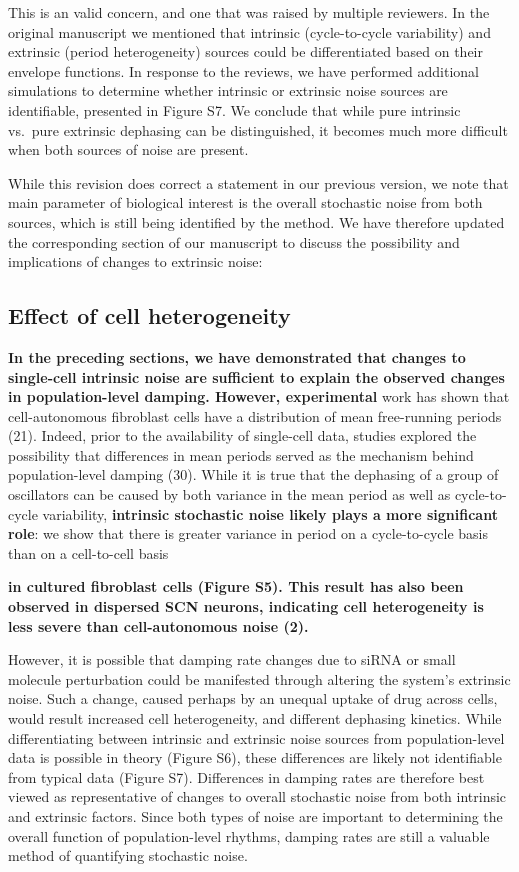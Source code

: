 \documentclass[11pt, letterpaper]{article}
\newenvironment{manuscript}[1]{\begin{center}\begin{tcolorbox}[colback=green!5!white,colframe=green!75!black,width=\textwidth,title={#1},breakable,fonttitle=\bfseries]}{\end{tcolorbox}\end{center}}
\begin{document}
This is an valid concern, and one that was raised by multiple reviewers.
In the original manuscript we mentioned that intrinsic (cycle-to-cycle variability) and extrinsic (period heterogeneity) sources could be differentiated based on their envelope functions.
In response to the reviews, we have performed additional simulations to determine whether intrinsic or extrinsic noise sources are identifiable, presented in Figure S7.
We conclude that while pure intrinsic vs.\ pure extrinsic dephasing can be distinguished, it becomes much more difficult when both sources of noise are present.

While this revision does correct a statement in our previous version, we note that main parameter of biological interest is the overall stochastic noise from both sources, which is still being identified by the method.
We have therefore updated the corresponding section of our manuscript to discuss the possibility and implications of changes to extrinsic noise:

\begin{manuscript}{Page 8}
  \section*{Effect of cell heterogeneity}
  {\bfseries
In the preceding sections, we have demonstrated that changes to single-cell intrinsic noise are sufficient to explain the observed changes in population-level damping. 
However, experimental} work has shown that cell-autonomous fibroblast cells have a distribution of mean free-running periods (21). 
Indeed, prior to the availability of single-cell data, studies explored the possibility that differences in mean periods served as the mechanism behind population-level damping (30). 
While it is true that the dephasing of a group of oscillators can be caused by both variance in the mean period as well as cycle-to-cycle variability, {\bfseries intrinsic stochastic noise likely plays a more significant role}: we show that there is greater variance in period on a cycle-to-cycle basis than on a cell-to-cell basis {\bfseries in cultured fibroblast cells (Figure S5). 
This result has also been observed in dispersed SCN neurons, indicating cell heterogeneity is less severe than cell-autonomous noise (2).

However, it is possible that damping rate changes due to siRNA or small molecule perturbation could be manifested through altering the system's extrinsic noise. 
Such a change, caused perhaps by an unequal uptake of drug across cells, would result increased cell heterogeneity, and different dephasing kinetics. 
While differentiating between intrinsic and extrinsic noise sources from population-level data is possible in theory (Figure S6), these differences are likely not identifiable from typical data (Figure S7). 
Differences in damping rates are therefore best viewed as representative of changes to overall stochastic noise from both intrinsic and extrinsic factors. 
Since both types of noise are important to determining the overall function of population-level rhythms, damping rates are still a valuable method of quantifying stochastic noise.}
\end{manuscript}
\end{document}
